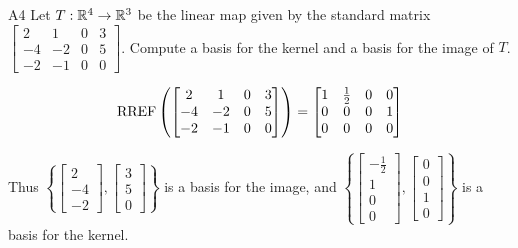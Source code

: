\begin{problem}{A4}
Let $T: \mathbb{R}^4 \rightarrow \mathbb{R}^3$ be the linear map given by the standard matrix
\(
  \begin{bmatrix}
    2 & 1 & 0 & 3 \\
    -4 & -2 & 0 & 5 \\
    -2 & -1 & 0 & 0
  \end{bmatrix}
\). Compute a basis for the kernel and a basis for the image of $T$.
\end{problem}
\begin{solution}
\[
  \operatorname{RREF} \left(\begin{bmatrix}
    2 & 1 & 0 & 3 \\
    -4 & -2 & 0 & 5 \\
    -2 & -1 & 0 & 0
  \end{bmatrix} \right) = \begin{bmatrix}
    1 & \frac{1}{2} & 0 & 0 \\
    0 & 0 & 0 & 1 \\
    0 & 0 & 0 & 0
  \end{bmatrix}
\]

Thus \(\left\{
\begin{bmatrix}
  2 \\ -4 \\ -2
\end{bmatrix},
\begin{bmatrix}
  3 \\ 5 \\ 0
\end{bmatrix}
\right\} \) is a basis for the image, and \(\left\{
  \begin{bmatrix} -\frac{1}{2} \\ 1 \\ 0 \\ 0\end{bmatrix},
  \begin{bmatrix} 0 \\ 0 \\ 1 \\ 0\end{bmatrix}
\right\} \) is a basis for the kernel.
\end{solution}
